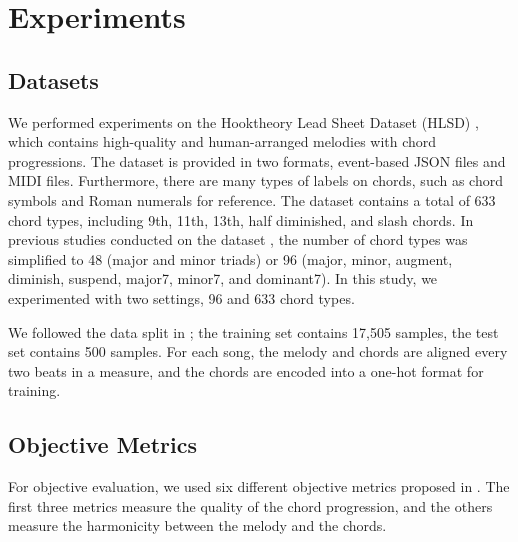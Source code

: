 \documentclass{article}
\begin{document}
\section{Experiments}

\subsection{Datasets}

We performed experiments on the Hooktheory Lead Sheet Dataset (HLSD) \cite{Anderson}, which contains high-quality and human-arranged melodies with chord progressions. The dataset is provided in two formats, event-based JSON files and MIDI files. Furthermore, there are many types of labels on chords, such as chord symbols and Roman numerals for reference. The dataset contains a total of 633 chord types, including 9th, 11th, 13th, half diminished, and slash chords. In previous studies conducted on the dataset \cite{Lim2017,Yeh2020,Sun2020}, the number of chord types was simplified to 48 (major and minor triads) or 96 (major, minor, augment, diminish, suspend, major7, minor7,
and dominant7). In this study, we experimented with two settings, 96 and 633 chord types.

We followed the data split in \cite{Sun2020}; the training set contains 17,505 samples, the test set contains 500 samples. For each song, the melody and chords are aligned every two beats in a measure, and the chords are encoded into a one-hot format for training.

\subsection{Objective Metrics}

For objective evaluation, we used six different objective metrics proposed in \cite{Yeh2020}. The first three metrics measure the quality of the chord progression, and the others measure the harmonicity between the melody and the chords.
\end{document}
